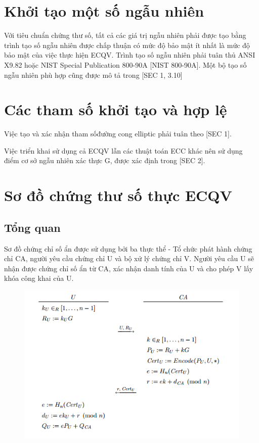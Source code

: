 \documentclass[a4paper,12pt]{report}
\begin{document}
\section{Khởi tạo một số ngẫu nhiên}
Với tiêu chuẩn chứng thư số, tất cả các giá trị ngẫu nhiên phải được tạo bằng trình tạo số ngẫu nhiên được chấp thuận có mức độ bảo mật ít nhất là mức độ bảo mật của việc thực hiện ECQV. Trình tạo số ngẫu nhiên phải tuân thủ ANSI X9.82 hoặc NIST Special Publication 800-90A [NIST 800-90A]. Một bộ tạo số ngẫu nhiên phù hợp cũng được mô tả trong [SEC 1, 3.10]
\section{Các tham số khởi tạo và hợp lệ}
Việc tạo và xác nhận tham sốđường cong elliptic phải tuân theo [SEC 1].

Việc triển khai sử dụng cả ECQV lẫn các thuật toán ECC khác nên sử dụng điểm cơ sở ngẫu nhiên xác thực G, được xác định trong [SEC 2].


\section{Sơ đồ chứng thư số thực ECQV}
\subsection{Tổng quan}
Sơ đồ chứng chỉ số ẩn được sử dụng bởi ba thực thể - Tổ chức phát hành chứng chỉ
CA, người yêu cầu chứng chỉ U và bộ xử lý chứng chỉ V. Người yêu cầu U sẽ nhận được chứng chỉ số ẩn từ CA, xác nhận danh tính của U và cho phép V lấy khóa công khai của U. 
\begin{figure}[h]
\begin{center}
\includegraphics[scale=0.9]{../im8.png}
\caption{}
\end{center}
\end{figure}
\end{document}
